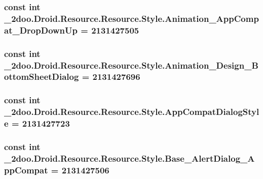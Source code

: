 \hypertarget{class__2doo_1_1_droid_1_1_resource_1_1_style_4358c9d6f710e44354cfbf09b88149b6}{
\subsubsection[{Animation\_\-AppCompat\_\-DropDownUp}]{\setlength{\rightskip}{0pt plus 5cm}const int \_\-2doo.Droid.Resource.Resource.Style.Animation\_\-AppCompat\_\-DropDownUp = 2131427505}}
\label{class__2doo_1_1_droid_1_1_resource_1_1_style_4358c9d6f710e44354cfbf09b88149b6}


\hypertarget{class__2doo_1_1_droid_1_1_resource_1_1_style_ed63da4b7f971de7b0b43326b11ddaa6}{
\subsubsection[{Animation\_\-Design\_\-BottomSheetDialog}]{\setlength{\rightskip}{0pt plus 5cm}const int \_\-2doo.Droid.Resource.Resource.Style.Animation\_\-Design\_\-BottomSheetDialog = 2131427696}}
\label{class__2doo_1_1_droid_1_1_resource_1_1_style_ed63da4b7f971de7b0b43326b11ddaa6}


\hypertarget{class__2doo_1_1_droid_1_1_resource_1_1_style_9c9faa83e26f7990fd3aa641f0d008a9}{
\subsubsection[{AppCompatDialogStyle}]{\setlength{\rightskip}{0pt plus 5cm}const int \_\-2doo.Droid.Resource.Resource.Style.AppCompatDialogStyle = 2131427723}}
\label{class__2doo_1_1_droid_1_1_resource_1_1_style_9c9faa83e26f7990fd3aa641f0d008a9}


\hypertarget{class__2doo_1_1_droid_1_1_resource_1_1_style_aabb6e9b21f8141fa2d7fa1abd2570d3}{
\subsubsection[{Base\_\-AlertDialog\_\-AppCompat}]{\setlength{\rightskip}{0pt plus 5cm}const int \_\-2doo.Droid.Resource.Resource.Style.Base\_\-AlertDialog\_\-AppCompat = 2131427506}}
\label{class__2doo_1_1_droid_1_1_resource_1_1_style_aabb6e9b21f8141fa2d7fa1abd2570d3}


